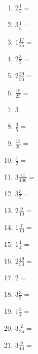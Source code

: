 \documentclass[12pt]{article}
\begin{document}
\begin{enumerate}
\newpage
\item \large $ 2 \frac{1}{5} = $ \vspace{1.5cm}
\item \large $ 3 \frac{1}{5} = $ \vspace{1.5cm}
\item \large $ 1 \frac{17}{25} = $ \vspace{1.5cm}
\item \large $ 2 \frac{3}{5} = $ \vspace{1.5cm}
\item \large $ 2 \frac{39}{50} = $ \vspace{1.5cm}
\item \large $ \frac{19}{25} = $ \vspace{1.5cm}
\item \large $ 3 = $ \vspace{1.5cm}
\item \large $ \frac{3}{5} = $ \vspace{1.5cm}
\item \large $ \frac{13}{25} = $ \vspace{1.5cm}
\item \large $ \frac{1}{2} = $ \vspace{1.5cm}
\newpage
\item \large $ 3 \frac{41}{100} = $ \vspace{1.5cm}
\item \large $ 3 \frac{3}{5} = $ \vspace{1.5cm}
\item \large $ 2 \frac{9}{10} = $ \vspace{1.5cm}
\item \large $ 1 \frac{7}{10} = $ \vspace{1.5cm}
\item \large $ 1 \frac{1}{4} = $ \vspace{1.5cm}
\item \large $ 2 \frac{49}{50} = $ \vspace{1.5cm}
\item \large $ 2 = $ \vspace{1.5cm}
\item \large $ 3 \frac{3}{5} = $ \vspace{1.5cm}
\item \large $ 1 \frac{3}{4} = $ \vspace{1.5cm}
\item \large $ 3 \frac{2}{25} = $ \vspace{1.5cm}
\newpage
\item \large $ 3 \frac{9}{10} = $ \vspace{1.5cm}

\end{enumerate}
\end{document}

